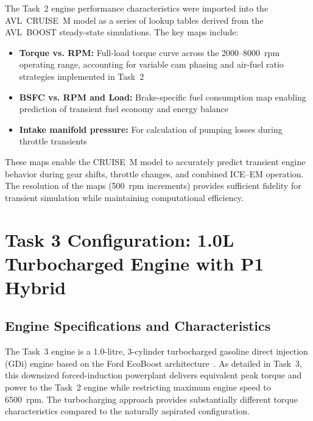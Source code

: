 The Task~2 engine performance characteristics were imported into the AVL~CRUISE~M model as a series of lookup tables derived from the AVL~BOOST steady-state simulations. The key maps include:

\begin{itemize}
    \item \textbf{Torque vs. RPM:} Full-load torque curve across the 2000--8000~rpm operating range, accounting for variable cam phasing and air-fuel ratio strategies implemented in Task~2
    \item \textbf{BSFC vs. RPM and Load:} Brake-specific fuel consumption map enabling prediction of transient fuel economy and energy balance
    \item \textbf{Intake manifold pressure:} For calculation of pumping losses during throttle transients
\end{itemize}

These maps enable the CRUISE~M model to accurately predict transient engine behavior during gear shifts, throttle changes, and combined ICE--EM operation. The resolution of the maps (500~rpm increments) provides sufficient fidelity for transient simulation while maintaining computational efficiency.

\section{Task 3 Configuration: 1.0L Turbocharged Engine with P1 Hybrid}

\subsection{Engine Specifications and Characteristics}

The Task~3 engine is a 1.0-litre, 3-cylinder turbocharged gasoline direct injection (GDi) engine based on the Ford EcoBoost architecture~\cite{ford_ecoboost}. As detailed in Task~3, this downsized forced-induction powerplant delivers equivalent peak torque and power to the Task~2 engine while restricting maximum engine speed to 6500~rpm. The turbocharging approach provides substantially different torque characteristics compared to the naturally aspirated configuration.

